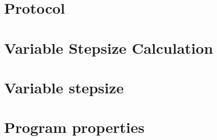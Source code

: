 \documentclass[11pt,twoside,a4paper]{article}
\begin{document}
\section{Protocol}



\section{Variable Stepsize Calculation}



\appendix

\section{Variable stepsize }



\section{Program properties}





\end{document}
